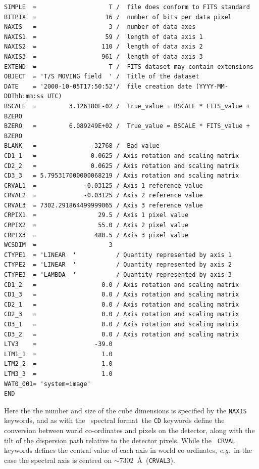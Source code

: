 \documentclass[twoside,11pt]{article}
\newcommand{\htmlref}[2]{#1}
\begin{document}
\begin{\htmlonly}
\small\begin{verbatim}
SIMPLE  =                    T /  file does conform to FITS standard
BITPIX  =                   16 /  number of bits per data pixel
NAXIS   =                    3 /  number of data axes
NAXIS1  =                   59 /  length of data axis 1
NAXIS2  =                  110 /  length of data axis 2
NAXIS3  =                  961 /  length of data axis 3
EXTEND  =                    T /  FITS dataset may contain extensions
OBJECT  = 'T/S MOVING field  ' /  Title of the dataset
DATE    = '2000-10-05T17:50:52'/  file creation date (YYYY-MM-DDThh:mm:ss UTC)
BSCALE  =         3.126180E-02 /  True_value = BSCALE * FITS_value + BZERO
BZERO   =         6.089249E+02 /  True_value = BSCALE * FITS_value + BZERO
BLANK   =               -32768 /  Bad value
CD1_1   =               0.0625 / Axis rotation and scaling matrix
CD2_2   =               0.0625 / Axis rotation and scaling matrix
CD3_3   = 5.795317000000068219 / Axis rotation and scaling matrix
CRVAL1  =             -0.03125 / Axis 1 reference value
CRVAL2  =             -0.03125 / Axis 2 reference value
CRVAL3  = 7302.291864499999065 / Axis 3 reference value
CRPIX1  =                 29.5 / Axis 1 pixel value
CRPIX2  =                 55.0 / Axis 2 pixel value
CRPIX3  =                480.5 / Axis 3 pixel value
WCSDIM  =                    3   
CTYPE1  = 'LINEAR  '           / Quantity represented by axis 1
CTYPE2  = 'LINEAR  '           / Quantity represented by axis 2
CTYPE3  = 'LAMBDA  '           / Quantity represented by axis 3
CD1_2   =                  0.0 / Axis rotation and scaling matrix
CD1_3   =                  0.0 / Axis rotation and scaling matrix
CD2_1   =                  0.0 / Axis rotation and scaling matrix
CD2_3   =                  0.0 / Axis rotation and scaling matrix
CD3_1   =                  0.0 / Axis rotation and scaling matrix
CD3_2   =                  0.0 / Axis rotation and scaling matrix
LTV3    =                -39.0   
LTM1_1  =                  1.0   
LTM2_2  =                  1.0  
LTM3_3  =                  1.0  
WAT0_001= 'system=image'
END
\end{verbatim}\normalsize

Here the the number and size of the cube dimensions is specified by
the {\tt NAXIS} keywords, and as with the \htmlref{\IRAF\ spectral
format}{sc16_iraf}\normalsize\ the {\tt CD} keywords define the conversion between
world co-ordinates and pixels on the detector, along with the tilt of
the dispersion path relative to the detector pixels.  While the {\tt
CRVAL} keywords defines the central value of each axis in world
co-ordinates, \emph{e.g.}\ in the case the spectral axis is centred on
$\sim$7302~\AA\ ({\tt CRVAL3}).


\end{\htmlonly}
\end{document}

